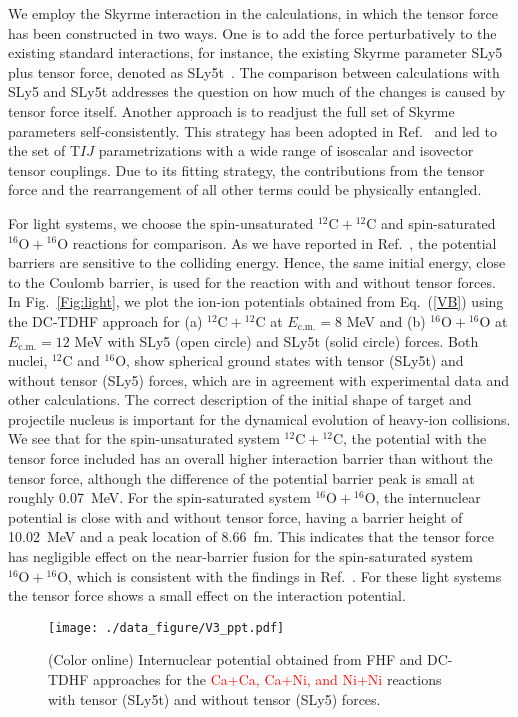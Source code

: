 \documentclass[aps,prc,twocolumn,showpacs,superscriptaddress,longbibliography,nofootinbib,floatfix,10pt]{revtex4-1}
\begin{document}
We employ the Skyrme interaction in the calculations, in which the tensor force has been constructed in two ways.
One is to add the force perturbatively to the existing standard interactions, for instance,
the existing Skyrme parameter SLy5~\cite{Chabanat1998_NPA635-231} plus tensor force, denoted as SLy5t~\cite{Colo2007_PLB646-227}.
The comparison between calculations with SLy5 and SLy5t addresses the question on how much of the changes is caused by tensor force itself.
Another approach is to readjust the full set of Skyrme parameters self-consistently.
This strategy has been adopted in Ref.~\cite{Lesinski2007_PRC76-014312} and led to
the set of T$IJ$ parametrizations with a wide range of isoscalar and isovector tensor couplings.
Due to its fitting strategy, the contributions from the tensor force and the rearrangement of all other terms could be physically entangled.

For light systems, we choose the spin-unsaturated $^{12}\mathrm{C}+\mathrm{^{12}C}$ and spin-saturated $^{16}\mathrm{O}+\mathrm{^{16}O}$ reactions
for comparison. As we have reported in Ref.~\cite{Umar2014_PRC89-034611}, the potential barriers are sensitive to the
colliding energy. Hence, the same initial energy, close to the Coulomb barrier, is used for the reaction with and without tensor forces.
In Fig.~\ref{Fig:light}, we plot the ion-ion potentials obtained from Eq.~(\ref{VB}) using the DC-TDHF approach for (a) $^{12}\mathrm{C}+\mathrm{^{12}C}$
at $E_{\mathrm{c.m.}}=8$ MeV  and (b) $^{16}\mathrm{O}+\mathrm{^{16}O}$ at $E_{\mathrm{c.m.}}=12$ MeV with SLy5 (open circle) and SLy5t (solid circle) forces.
Both nuclei, $^{12}\mathrm{C}$ and $\mathrm{^{16}O}$, show spherical ground states with tensor (SLy5t) and without tensor (SLy5) forces, which
are in agreement with experimental data and other calculations. The correct description of the initial shape of
target and projectile nucleus is important for the dynamical evolution of heavy-ion collisions.
We see that for the spin-unsaturated system $^{12}\mathrm{C}+\mathrm{^{12}C}$, the potential with the tensor force included has an overall higher
interaction barrier than without the tensor force, although the difference of the potential barrier peak is small at roughly 0.07~MeV.
For the spin-saturated system $^{16}\mathrm{O}+\mathrm{^{16}O}$, the internuclear potential is close with and without tensor force,
having a barrier height of 10.02~MeV and a peak location of 8.66~fm. This indicates that the tensor force has negligible effect on the near-barrier fusion
for the spin-saturated system $^{16}\mathrm{O}+\mathrm{^{16}O}$, which is consistent with the findings in Ref.~\cite{Stevenson2016_PRC93-054617}.
For these light systems the tensor force shows a small effect on the interaction potential.
\begin{figure*}
\texttt{[image: ./data\_figure/V3\_ppt.pdf]}
\caption{(Color online) Internuclear potential obtained from FHF and DC-TDHF approaches for the \textcolor{red}{Ca+Ca, Ca+Ni, and Ni+Ni} reactions
with tensor (SLy5t) and without tensor (SLy5) forces.
\label{Fig:medium}}
\end{figure*}
\end{document}
